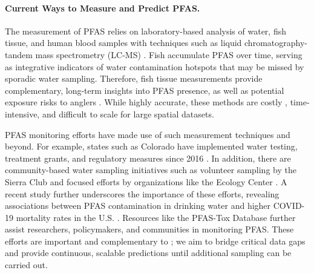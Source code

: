 \paragraph{Current Ways to Measure and Predict PFAS.}
The measurement of PFAS  relies on laboratory-based analysis of water, fish tissue, and human blood samples with techniques such as liquid chromatography-tandem mass spectrometry (LC-MS) \cite{Shoemaker_2020_Method537}. Fish accumulate PFAS over time, serving as integrative indicators of water contamination hotspots that may be missed by sporadic water sampling. Therefore, fish tissue measurements %
provide complementary, long-term  insights into PFAS presence, as well as potential exposure risks to anglers \cite{EWGstudy2023}. While highly accurate, these methods are costly \cite{Doudrick_2024}, time-intensive, and difficult to scale for large spatial datasets.

PFAS monitoring efforts have  made use of such  measurement techniques and beyond.  %
For example, states such as Colorado have implemented water testing, treatment grants, and regulatory measures since 2016 \cite{CDPHE_PFAS_Action_Plan}. In addition, there are community-based water sampling initiatives such as volunteer sampling by the Sierra Club \cite{CommunityScience} and focused efforts by  organizations like the  Ecology Center  \cite{ProtectingCommunitiesFromPFAS}. A recent study further underscores the importance of these efforts, revealing associations between PFAS contamination in drinking water and higher COVID-19 mortality rates in the U.S. \cite{Liddie_Bind_Karra_Sunderland_2024}. %
Resources like the PFAS-Tox Database \cite{Pelch_Reade_Kwiatkowski_Merced-Nieves_Cavalier_Schultz_Wolffe_Varshavsky_2022} further assist researchers,  policymakers, and communities in monitoring PFAS. 
These efforts are important and complementary to \pname; we aim to  bridge critical data gaps and provide continuous, scalable predictions until additional sampling can be carried out.

